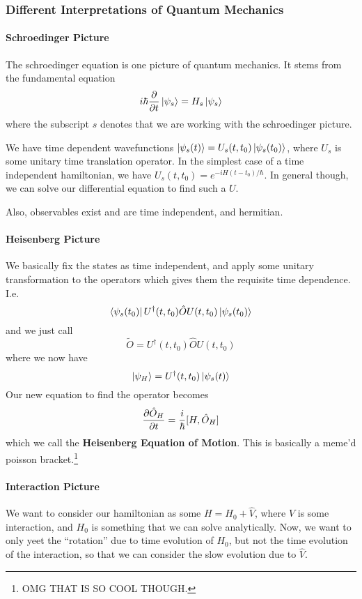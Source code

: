 \documentclass{article}
\theoremstyle{definition}
\begin{document}
\subsubsection{Different Interpretations of Quantum Mechanics}
\paragraph{Schroedinger Picture}
The schroedinger equation is one picture of quantum mechanics. It stems from the fundamental equation
\begin{equation}
	i\hbar\pdv{t}\ket{\psi_s}=H_s\ket{\psi_s}
\end{equation}
where the subscript $s$ denotes that we are working with the schroedinger picture.

We have time dependent wavefunctions $\ket{\psi_s(t)}=U_s(t,t_0)\ket{\psi_s(t_0)}$, where $U_s$ is some unitary time translation operator. 
In the simplest case of a time independent hamiltonian, we have $U_s(t,t_0)=e^{-iH(t-t_0)/\hbar}$. In general though, we can solve our differential equation to find such a $U$.

Also, observables exist and are time independent, and hermitian.

\paragraph{Heisenberg Picture} We basically fix the states as time independent, and apply some unitary transformation to the operators which gives them the requisite time dependence. I.e.
\begin{equation}
	\bra{\psi_s(t_0)}U^\dag(t,t_0)\hat OU(t,t_0)\ket{\psi_s(t_0)}
\end{equation}
and we just call
\begin{equation}
\tilde O=U^\dag(t,t_0)\hat OU(t,t_0)
\end{equation}
where we now have
\begin{equation}
	\ket{\psi_H}=U^\dag(t,t_0)\ket{\psi_s(t)}
\end{equation}
Our new equation to find the operator becomes
\begin{equation}
	\pdv{\hat O_H}{t}=\frac{i}{\hbar}[H,\hat O_H]
\end{equation}
which we call the \textbf{Heisenberg Equation of Motion}. This is basically a meme'd poisson bracket.\footnote{OMG THAT IS SO COOL THOUGH.}

\paragraph{Interaction Picture}
We want to consider our hamiltonian as some $H=H_0+\hat V$, where $\hat V$ is some interaction, and $H_0$ is something that we can solve analytically. Now, we want to only yeet the ``rotation'' due to time evolution of $H_0$, but not the time evolution of the interaction, so that we can consider the slow evolution due to $\hat V$.
\end{document}
